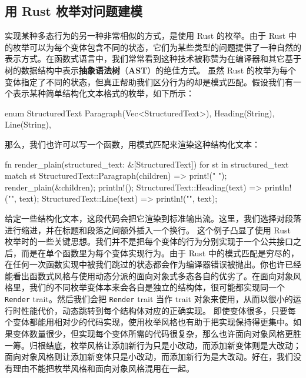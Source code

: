 \subsection{用 Rust 枚举对问题建模}
\label{idx:idx_0730cf4d}
\label{idx:idx_3366d536}
\label{idx:idx_bff72047}
实现某种多态行为的另一种非常相似的方式，是使用 Rust 的枚举。由于 Rust 中的枚举可以为每个变体包含不同的状态，它们为某些类型的问题提供了一种自然的表示方式。在函数式语言中，我们常常看到这种技术被称赞为在编译器和其它基于树的数据结构中表示\textbf{抽象语法树}（\textbf{AST}）的绝佳方式。
虽然 Rust 的枚举为每个变体指定了不同的状态，但真正帮助我们区分行为的却是模式匹配。假设我们有一个表示某种简单结构化文本格式的枚举，如下所示：
\begin{codebox}[rust]
enum StructuredText {
      Paragraph(Vec<StructuredText>),
      Heading(String),
      Line(String),
}
\end{codebox}
那么，我们也许可以写一个函数，用模式匹配来渲染这种结构化文本：
\begin{codebox}[rust]
fn render_plain(structured_text: &[StructuredText]) {
      for st in structured_text {
            match st {
                  StructuredText::Paragraph(children) => {
                        print!("      ");
                        render_plain(&children);
                        println!();
                  }
                  StructuredText::Heading(text) => {
                        println!("\n{}\n", text);
                  }
                  StructuredText::Line(text) => {
                        println!("{}", text);
                  }
            }
      }
}
\end{codebox}
\label{idx:idx_558de397}
\label{idx:idx_58d6c46c}
给定一些结构化文本，这段代码会把它渲染到标准输出流。这里，我们选择对段落进行缩进，并在标题和段落之间额外插入一个换行。
这个例子凸显了使用 Rust 枚举时的一些关键思想。我们并不是把每个变体的行为分别实现于一个公共接口之后，而是在单个函数里为每个变体实现行为。由于 Rust 中的模式匹配是穷尽的，在任何一次函数实现中被我们跳过的状态都会作为编译器错误被抛出。你也许已经能看出函数式风格与使用动态分派的面向对象式多态各自的优劣了。在面向对象风格里，我们的不同枚举变体本来会各自是独立的结构体，很可能都实现同一个 \texttt{Render} trait。然后我们会把 \texttt{Render} trait 当作 trait 对象来使用，从而以很小的运行时性能代价，动态跳转到每个结构体对应的正确实现。
\label{idx:idx_2432ad7a}
\label{idx:idx_4163b701}
即使变体很多，只要每个变体都能用相对少的代码实现，使用枚举风格也有助于把实现保持得更集中。如果变体数量很少，但实现每个变体所需的代码很复杂，那么也许面向对象风格更胜一筹。归根结底，枚举风格让添加新行为只是小改动，而添加新变体则是大改动；面向对象风格则让添加新变体只是小改动，而添加新行为是大改动。好在，我们没有理由不能把枚举风格和面向对象风格混用在一起。
